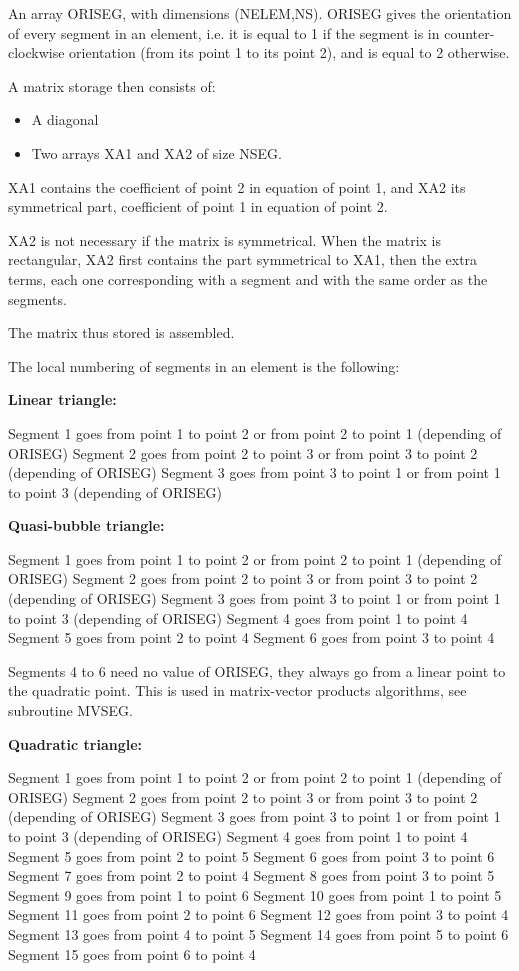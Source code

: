 An array ORISEG, with dimensions (NELEM,NS). ORISEG gives the orientation of
every segment in an element, i.e. it is equal to 1 if the segment is in
counter-clockwise orientation (from its point 1 to its point 2), and is equal
to 2 otherwise.

A matrix storage then consists of:
\begin{itemize}
  \item A diagonal
  \item Two arrays XA1 and XA2 of size NSEG.
\end{itemize}

XA1 contains the coefficient of point 2 in equation of point 1, and XA2 its
symmetrical part, coefficient of point 1 in equation of point 2.

XA2 is not necessary if the matrix is symmetrical. When the matrix is
rectangular, XA2 first contains the part symmetrical to XA1, then the extra
terms, each one corresponding with a segment and with the same order as the
segments.

The matrix thus stored is assembled.

The local numbering of segments in an element is the following:

\textbf{Linear triangle:}

Segment 1 goes from point 1 to point 2 or from point 2 to point 1 (depending of ORISEG)
Segment 2 goes from point 2 to point 3 or from point 3 to point 2 (depending of ORISEG)
Segment 3 goes from point 3 to point 1 or from point 1 to point 3 (depending of ORISEG)

\textbf{Quasi-bubble triangle:}

Segment 1 goes from point 1 to point 2 or from point 2 to point 1 (depending of ORISEG)
Segment 2 goes from point 2 to point 3 or from point 3 to point 2 (depending of ORISEG)
Segment 3 goes from point 3 to point 1 or from point 1 to point 3 (depending of ORISEG)
Segment 4 goes from point 1 to point 4
Segment 5 goes from point 2 to point 4
Segment 6 goes from point 3 to point 4

Segments 4 to 6 need no value of ORISEG, they always go from a linear point to
the quadratic point. This is used in matrix-vector products algorithms, see
subroutine MVSEG.

\textbf{Quadratic triangle:}

Segment 1 goes from point 1 to point 2 or from point 2 to point 1 (depending of ORISEG)
Segment 2 goes from point 2 to point 3 or from point 3 to point 2 (depending of ORISEG)
Segment 3 goes from point 3 to point 1 or from point 1 to point 3 (depending of ORISEG)
Segment 4 goes from point 1 to point 4
Segment 5 goes from point 2 to point 5
Segment 6 goes from point 3 to point 6
Segment 7 goes from point 2 to point 4
Segment 8 goes from point 3 to point 5
Segment 9 goes from point 1 to point 6
Segment 10 goes from point 1 to point 5
Segment 11 goes from point 2 to point 6
Segment 12 goes from point 3 to point 4
Segment 13 goes from point 4 to point 5
Segment 14 goes from point 5 to point 6
Segment 15 goes from point 6 to point 4

